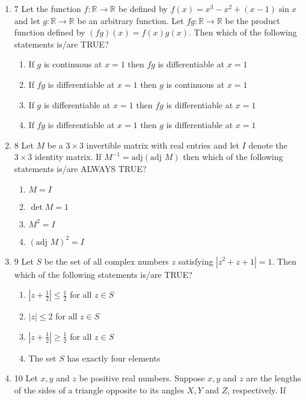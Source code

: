 \documentclass{article}
\begin{document}
\begin{enumerate}
\item 7  Let the function $f: \mathbb{R} \to \mathbb{R}$ be defined by $f(x) = x^3 - x^2 + (x - 1) \sin x$ and let $g: \mathbb{R} \to \mathbb{R}$ be an arbitrary function. Let $fg: \mathbb{R} \to \mathbb{R}$ be the product function defined by $(fg)(x) = f(x)g(x)$. Then which of the following statements is/are TRUE?

    \begin{enumerate}
        \item  If $g$ is continuous at $x = 1$ then $fg$ is differentiable at $x = 1$
        \item  If $fg$ is differentiable at $x = 1$ then $g$ is continuous at $x = 1$
        \item  If $g$ is differentiable at $x = 1$ then $fg$ is differentiable at $x = 1$
        \item  If $fg$ is differentiable at $x = 1$ then $g$ is differentiable at $x = 1$
    \end{enumerate}

\item 8  Let $M$ be a $3 \times 3$ invertible matrix with real entries and let $I$ denote the $3 \times 3$ identity matrix. If $ M^{-1} = \text{adj}(\text{adj } M)$ then which of the following statements is/are ALWAYS TRUE?

    \begin{enumerate}
        \item  $M = I$
        \item  $\det M = 1$
        \item  $M^2 = I$
        \item  $(\text{adj } M)^2 = I$
    \end{enumerate}
\item 9  Let $S$ be the set of all complex numbers $z$ satisfying $|z^2 + z + 1| = 1$. Then which of the following statements is/are TRUE?

    \begin{enumerate}
        \item  $|z + \frac{1}{2}| \leq \frac{1}{2}$ for all $z \in S$
        \item  $|z| \leq 2$ for all $z \in S$
        \item  $|z + \frac{1}{2}| \geq \frac{1}{2}$ for all $z \in S$
        \item  The set $S$ has exactly four elements
    \end{enumerate}

\item 10  Let $x, y$ and $z$ be positive real numbers. Suppose $x, y$ and $z$ are the lengths of the sides of a triangle opposite to its angles $X, Y$ and $Z$, respectively. If 


\end{enumerate}
\end{document}
